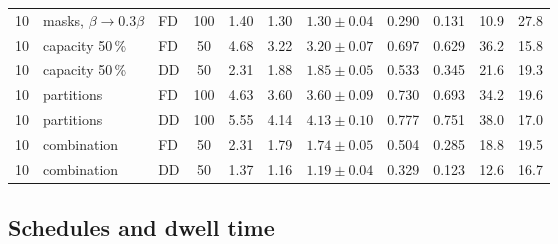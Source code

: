 \begin{table}[tbp]
\begin{tabular}{@{}cllcccccccc@{}}
    10 & masks, $\beta\to0.3\beta$ & FD & 100 & 1.40 & 1.30 & $1.30\pm0.04$ & 0.290 & 0.131 & 10.9 & 27.8 \\
    10 & capacity 50\,\% & FD & 50 & 4.68 & 3.22 & $3.20\pm0.07$ & 0.697 & 0.629 & 36.2 & 15.8 \\
    10 & capacity 50\,\% & DD & 50 & 2.31 & 1.88 & $1.85\pm0.05$ & 0.533 & 0.345 & 21.6 & 19.3 \\
    10 & partitions & FD & 100 & 4.63 & 3.60 & $3.60\pm0.09$ & 0.730 & 0.693 & 34.2 & 19.6 \\
    10 & partitions & DD & 100 & 5.55 & 4.14 & $4.13\pm0.10$ & 0.777 & 0.751 & 38.0 & 17.0 \\
    10 & combination & FD & 50 & 2.31 & 1.79 & $1.74\pm0.05$ & 0.504 & 0.285 & 18.8 & 19.5 \\
    10 & combination & DD & 50 & 1.37 & 1.16 & $1.19\pm0.04$ & 0.329 & 0.123 & 12.6 & 16.7 \\
    \bottomrule
  \end{tabular}
\end{table}

\subsection{Schedules and dwell time}\label{s7_interventions:sec:time}

